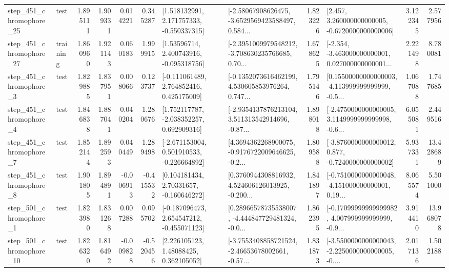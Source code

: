 \begin{tabular}{llrrrrllrlrr}
  step\_451\_chromophore\_25 &      test &      1.895111 &    1.909331 &      0.014221 &  0.345287 &    [1.518132991, 2.171757333, -0.550337315] &  [-2.58067908626475, -3.6529569423588497, 0.584... &       1.823226 &    [2.457, 3.260000000000005, -0.6720000000000006] &            3.122345 &          2.577956 \\
  step\_451\_chromophore\_27 &  training &      1.860960 &    1.921143 &      0.060183 &  1.999915 &     [1.53596714, 2.400743916, -0.095318756] &  [-2.3951009979548212, -3.708630235766685, 0.70... &       1.678625 &  [-2.354, -3.463000000000001, 0.027000000000001... &            2.221498 &          8.780081 \\
   step\_451\_chromophore\_3 &      test &      1.829885 &    1.837951 &      0.008066 &  0.123737 &    [-0.111061489, 2.764852416, 0.425175009] &  [-0.1352073616462199, 4.530605853976264, 0.747... &       1.795146 &  [0.15500000000000003, -4.113999999999999, -0.5... &            1.067088 &          1.747685 \\
   step\_451\_chromophore\_4 &      test &      1.846838 &    1.887041 &      0.040204 &  1.280676 &    [1.752117787, -2.038352257, 0.692909316] &  [-2.9354137876213104, 3.511313542914696, -0.87... &       1.898018 &  [-2.4750000000000005, 3.1149999999999998, -0.6... &            6.055081 &          2.449516 \\
   step\_451\_chromophore\_7 &      test &      1.852144 &    1.892593 &      0.040449 &  1.289498 &   [-2.671153004, 0.501910533, -0.226664892] &  [4.3694362268900075, -0.9176722009646625, -0.2... &       1.809588 &  [-3.8760000000000012, 0.877, -0.7240000000000002] &            5.937331 &         13.428689 \\
   step\_451\_chromophore\_8 &      test &      1.901805 &    1.894891 &     -0.006913 & -0.415532 &     [0.104181434, 2.70331657, -0.160646272] &  [0.3760944308816932, 4.524606126013925, -0.200... &       1.841897 &  [-0.7510000000000048, -4.151000000000001, 0.19... &            8.065574 &          5.501000 \\
   step\_501\_chromophore\_1 &      test &      1.823980 &    1.831268 &      0.007288 &  0.095702 &   [-0.187096473, 2.654547212, -0.455071123] &  [0.28966578735538007, -4.444847729481324, -0.0... &       1.862395 &  [-0.17099999999999982, 4.007999999999999, -0.9... &            3.914410 &         13.968078 \\
  step\_501\_chromophore\_10 &      test &      1.826320 &    1.816492 &     -0.009828 & -0.520456 &      [2.226105123, 1.48088425, 0.362105052] &  [-3.7553408858721524, -2.46653678002661, -0.57... &       1.831873 &  [-3.5500000000000043, -2.2250000000000005, -0.... &            2.017136 &          1.502188 \\

\end{tabular}

